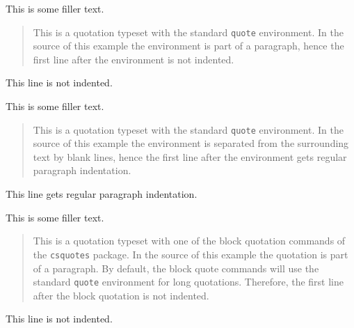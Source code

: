 \documentclass[a4paper]{article}
\newcommand*{\example}[1]{%
  \addvspace{\baselineskip}%
  \par\noindent\hspace{-4em}%
  \makebox[3em][r]{\textbf{Ex. #1}}%
  \hspace{1em}\ignorespaces}
\begin{document}



\example{3}
This is some filler text.
\begin{quote}
This is a quotation typeset with the standard \texttt{quote} environment. In
the source of this example the environment is part of a paragraph, hence the
first line after the environment is not indented.
\end{quote}
This line is not indented.


\example{4}
This is some filler text.

\begin{quote}
This is a quotation typeset with the standard \texttt{quote} environment. In
the source of this example the environment is separated from the surrounding
text by blank lines, hence the first line after the environment gets regular
paragraph indentation.
\end{quote}

This line gets regular paragraph indentation.


\example{5}
This is some filler text. \blockquote{This is a quotation typeset with one of
the block quotation commands of the \texttt{csquotes} package. In the source
of this example the quotation is part of a paragraph. By default, the block
quote commands will use the standard \texttt{quote} environment for long
quotations. Therefore, the first line after the block quotation is not
indented.} This line is not indented.
\end{document}
